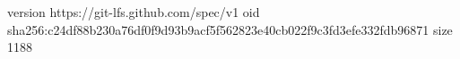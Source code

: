 version https://git-lfs.github.com/spec/v1
oid sha256:c24df88b230a76df0f9d93b9acf5f562823e40cb022f9c3fd3efe332fdb96871
size 1188
